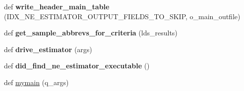 \begin{DoxyCompactItemize}
\item 
def {\bfseries write\+\_\+header\+\_\+main\+\_\+table} (I\+D\+X\+\_\+\+N\+E\+\_\+\+E\+S\+T\+I\+M\+A\+T\+O\+R\+\_\+\+O\+U\+T\+P\+U\+T\+\_\+\+F\+I\+E\+L\+D\+S\+\_\+\+T\+O\+\_\+\+S\+K\+IP, o\+\_\+main\+\_\+outfile)\hypertarget{namespacenegui_1_1pgdriveneestimator_adffb79ac878373773c2927935685788d}{}\label{namespacenegui_1_1pgdriveneestimator_adffb79ac878373773c2927935685788d}

\item 
def {\bfseries get\+\_\+sample\+\_\+abbrevs\+\_\+for\+\_\+criteria} (lds\+\_\+results)\hypertarget{namespacenegui_1_1pgdriveneestimator_a0f1e4581a5ef4ce1eb077c445856ed8f}{}\label{namespacenegui_1_1pgdriveneestimator_a0f1e4581a5ef4ce1eb077c445856ed8f}

\item 
def {\bfseries drive\+\_\+estimator} (args)\hypertarget{namespacenegui_1_1pgdriveneestimator_a688d7a2f0a11f0225a5f95d7403d771e}{}\label{namespacenegui_1_1pgdriveneestimator_a688d7a2f0a11f0225a5f95d7403d771e}

\item 
def {\bfseries did\+\_\+find\+\_\+ne\+\_\+estimator\+\_\+executable} ()\hypertarget{namespacenegui_1_1pgdriveneestimator_acd20398ef9d21132f19d1c0e564b25b9}{}\label{namespacenegui_1_1pgdriveneestimator_acd20398ef9d21132f19d1c0e564b25b9}

\item 
def \hyperlink{namespacenegui_1_1pgdriveneestimator_a9195d73a2642b87625772820ffff8023}{mymain} (q\+\_\+args)
\end{DoxyCompactItemize}
